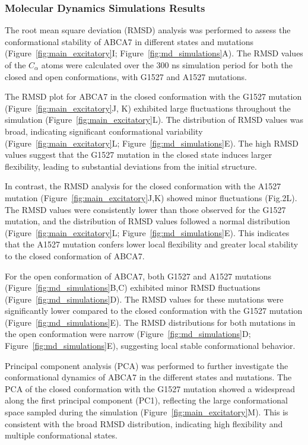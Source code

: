 \subsubsection{Molecular Dynamics Simulations Results} 
The root mean square deviation (RMSD) analysis was performed to assess the conformational stability of ABCA7 in different states and mutations (Figure~\ref{fig:main_excitatory}I; Figure~\ref{fig:md_simulations}A). The RMSD values of the $C_\alpha$ atoms were calculated over the 300 ns simulation period for both the closed and open conformations, with G1527 and A1527 mutations. 

The RMSD plot for ABCA7 in the closed conformation with the G1527 mutation (Figure~\ref{fig:main_excitatory}J, K) exhibited large fluctuations throughout the simulation (Figure~\ref{fig:main_excitatory}L). The distribution of RMSD values was broad, indicating significant conformational variability (Figure~\ref{fig:main_excitatory}L; Figure~\ref{fig:md_simulations}E). The high RMSD values suggest that the G1527 mutation in the closed state induces larger flexibility, leading to substantial deviations from the initial structure. 

In contrast, the RMSD analysis for the closed conformation with the A1527 mutation (Figure~\ref{fig:main_excitatory}J,K) showed minor fluctuations (Fig.2L). The RMSD values were consistently lower than those observed for the G1527 mutation, and the distribution of RMSD values followed a normal distribution (Figure~\ref{fig:main_excitatory}L; Figure~\ref{fig:md_simulations}E). This indicates that the A1527 mutation confers lower local flexibility and greater local stability to the closed conformation of ABCA7. 

For the open conformation of ABCA7, both G1527 and A1527 mutations (Figure~\ref{fig:md_simulations}B,C) exhibited minor RMSD fluctuations (Figure~\ref{fig:md_simulations}D). The RMSD values for these mutations were significantly lower compared to the closed conformation with the G1527 mutation (Figure~\ref{fig:md_simulations}E). The RMSD distributions for both mutations in the open conformation were narrow (Figure~\ref{fig:md_simulations}D; Figure~\ref{fig:md_simulations}E), suggesting local stable conformational behavior. 

Principal component analysis (PCA) was performed to further investigate the conformational dynamics of ABCA7 in the different states and mutations. The PCA of the closed conformation with the G1527 mutation showed a widespread along the first principal component (PC1), reflecting the large conformational space sampled during the simulation (Figure~\ref{fig:main_excitatory}M). This is consistent with the broad RMSD distribution, indicating high flexibility and multiple conformational states. 

